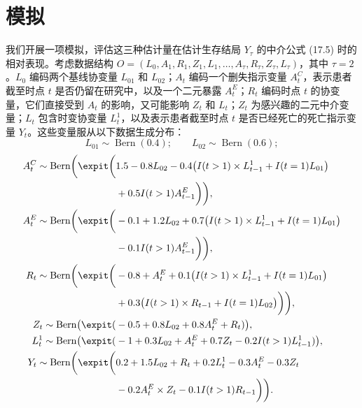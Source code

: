 \section{模拟}

我们开展一项模拟，评估这三种估计量在估计生存结局 $Y_\tau$ 的中介公式 (17.5) 时的相对表现。考虑数据结构 $O=(L_0,A_1,R_1,Z_1,L_1,\ldots,A_\tau,R_\tau,Z_\tau,L_\tau)$，其中 $\tau=2$。$L_0$ 编码两个基线协变量 $L_{01}$ 和 $L_{02}$；$A_t$ 编码一个删失指示变量 $A_t^C$，表示患者截至时点 $t$ 是否仍留在研究中，以及一个二元暴露 $A_t^E$；$R_t$ 编码时点 $t$ 的协变量，它们直接受到 $A_t$ 的影响，又可能影响 $Z_t$ 和 $L_t$；$Z_t$ 为感兴趣的二元中介变量；$L_t$ 包含时变协变量 $L_t^1$，以及表示患者截至时点 $t$ 是否已经死亡的死亡指示变量 $Y_t$。这些变量服从以下数据生成分布：
\[
 L_{01}\sim\operatorname{Bern}(0.4);\qquad
 L_{02}\sim\operatorname{Bern}(0.6);
\]
\[
\begin{aligned}
 A_t^C\sim\operatorname{Bern}\biggl(\expit\biggl(&1.5-0.8L_{02}
 -0.4\bigl(I(t>1)\times L_{t-1}^1+I(t=1)L_{01}\bigr)\\
 &+0.5I(t>1)A_{t-1}^E\biggr)\biggr),\\
 A_t^E\sim\operatorname{Bern}\biggl(\expit\biggl(&-0.1+1.2L_{02}
 +0.7\bigl(I(t>1)\times L_{t-1}^1+I(t=1)L_{01}\bigr)\\
 &-0.1I(t>1)A_{t-1}^E\biggr)\biggr),\\
 R_t\sim\operatorname{Bern}\biggl(\expit\biggl(&-0.8+A_t^E
 +0.1\bigl(I(t>1)\times L_{t-1}^1+I(t=1)L_{01}\bigr)\\
 &+0.3\bigl(I(t>1)\times R_{t-1}+I(t=1)L_{02}\bigr)\biggr)\biggr),\\
 Z_t\sim\operatorname{Bern}\bigl(\expit(&-0.5+0.8L_{02}+0.8A_t^E+R_t)\bigr),\\
 L_t^1\sim\operatorname{Bern}\bigl(\expit(&-1+0.3L_{02}+A_t^E+0.7Z_t-0.2I(t>1)L_{t-1}^1)\bigr),\\
 Y_t\sim\operatorname{Bern}\biggl(\expit\biggl(&0.2+1.5L_{02}+R_t+0.2L_t^1-0.3A_t^E-0.3Z_t\\
 &-0.2A_t^E\times Z_t-0.1I(t>1)R_{t-1}\biggr)\biggr).
\end{aligned}
\]

